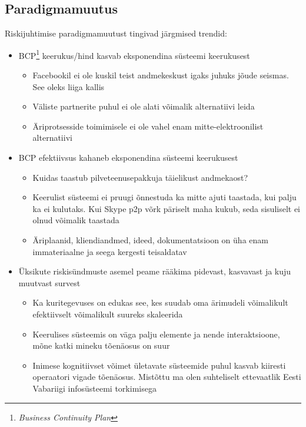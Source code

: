 \documentclass{article}
\begin{document}
\subsection{Paradigmamuutus}
Riskijuhtimise paradigmamuutust tingivad järgmised trendid:
	\begin{itemize}
		\item BCP\footnote{\emph{Business Continuity Plan}} keerukus/hind kasvab eksponendina süsteemi keerukusest
			\begin{itemize}
		\item Facebookil ei ole kuskil teist andmekeskust igaks juhuks jõude seismas. See oleks liiga kallis
		\item Väliste partnerite puhul ei ole alati võimalik alternatiivi leida
		\item Äriprotsesside toimimisele ei ole vahel enam mitte-elektroonilist alternatiivi
	\end{itemize}

		\item BCP efektiivsus kahaneb eksponendina süsteemi keerukusest
			\begin{itemize}
		\item Kuidas taastub pilveteenusepakkuja täielikust andmekaost?
		\item Keerulist süsteemi ei pruugi õnnestuda ka mitte ajuti taastada, kui palju ka ei kulutaks. Kui Skype p2p võrk päriselt maha kukub, seda sisuliselt ei olnud võimalik taastada
		\item Äriplaanid, kliendiandmed, ideed, dokumentatsioon on üha enam immateriaalne ja seega kergesti teisaldatav
	\end{itemize}

		\item Üksikute riskisündmuste asemel peame rääkima pidevast, kasvavast ja kuju muutvast survest
			\begin{itemize}
		\item Ka kuritegevuses on edukas see, kes suudab oma ärimudeli võimalikult efektiivselt võimalikult suureks skaleerida
		\item Keerulises süsteemis on väga palju elemente ja nende interaktsioone, mõne katki mineku tõenäosus on suur
		\item Inimese kognitiivset võimet ületavate süsteemide puhul kasvab kiiresti operaatori vigade tõenäosus. Mistõttu ma olen suhteliselt ettevaatlik Eesti Vabariigi infosüsteemi torkimisega
	\end{itemize}


\end{itemize}
\end{document}
